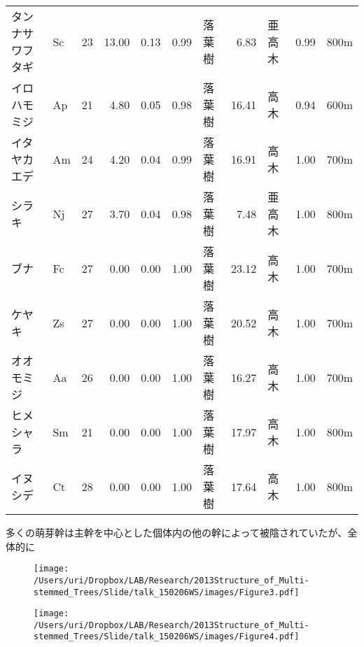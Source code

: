 \documentclass[a0, 36pt, plainboxedsections]{sciposter} %
\renewcommand{\baselinestretch}{1.2}
\begin{document}
\begin{multicols}{2}
\begin{table}[ht]
{\begin{tabular}{llrrrrlrlrl}
タンナサワフタギ  &  Sc &  23 & 13.00 & 0.13 & 0.99 & 落葉樹 & 6.83 & 亜高木 & 0.99 & 800m \\ 
\rowcolor{Blue2!30}イロハモミジ  &  Ap &  21 & 4.80 & 0.05 & 0.98 & 落葉樹 & 16.41 & 高木 & 0.94 & 600m \\ 
\rowcolor{Blue2!30}イタヤカエデ  &  Am &  24 & 4.20 & 0.04 & 0.99 & 落葉樹 & 16.91 & 高木 & 1.00 & 700m \\ 
\rowcolor{Blue2!30}シラキ  &  Nj &  27 & 3.70 & 0.04 & 0.98 & 落葉樹 & 7.48 & 亜高木 & 1.00 & 800m \\ 
\rowcolor{Blue2!30}ブナ  &  Fc &  27 & 0.00 & 0.00 & 1.00 & 落葉樹 & 23.12 & 高木 & 1.00 & 700m \\ 
\rowcolor{Blue2!30}ケヤキ  &  Zs &  27 & 0.00 & 0.00 & 1.00 & 落葉樹 & 20.52 & 高木 & 1.00 & 700m \\ 
\rowcolor{Blue2!30}オオモミジ  &  Aa &  26 & 0.00 & 0.00 & 1.00 & 落葉樹 & 16.27 & 高木 & 1.00 & 700m \\ 
\rowcolor{Blue2!30}ヒメシャラ  &  Sm &  21 & 0.00 & 0.00 & 1.00 & 落葉樹 & 17.97 & 高木 & 1.00 & 800m \\ 
\rowcolor{Blue2!30}イヌシデ  &  Ct &  28 & 0.00 & 0.00 & 1.00 & 落葉樹 & 17.64 & 高木 & 1.00 & 800m \\ 
  \hline\end{tabular}}
\end{table}

\renewcommand{\baselinestretch}{0.8}
\begin{mdframed}[style=subsection.frame]
  \huge\textbf{}
\end{mdframed}
\renewcommand{\baselinestretch}{1.2}

多くの萌芽幹は主幹を中心とした個体内の他の幹によって被陰されていたが、全体的に

\begin{figure}
	\begin{center}
		\texttt{[image: /Users/uri/Dropbox/LAB/Research/2013Structure\_of\_Multi-stemmed\_Trees/Slide/talk\_150206WS/images/Figure3.pdf]}
		
		\texttt{[image: /Users/uri/Dropbox/LAB/Research/2013Structure\_of\_Multi-stemmed\_Trees/Slide/talk\_150206WS/images/Figure4.pdf]}
	\end{center}
\end{figure}

\columnbreak
\renewcommand{\baselinestretch}{0.8}
\begin{mdframed}[style=subsection.frame]
  \huge\textbf{}
\end{mdframed}
\renewcommand{\baselinestretch}{1.2} %



\end{multicols}
\end{document}
